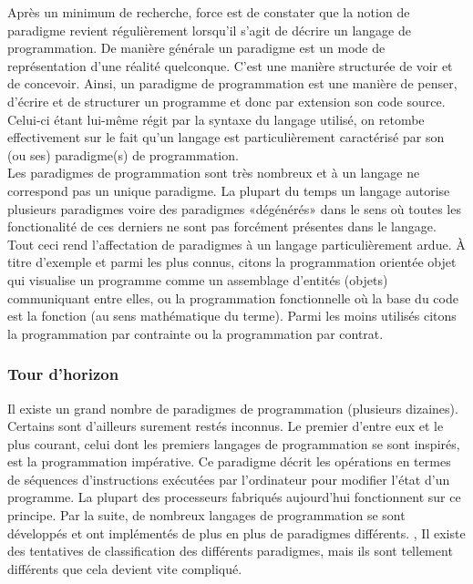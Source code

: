 Après un minimum de recherche, force est de constater que la notion de paradigme revient régulièrement lorsqu’il s’agit de décrire un langage de programmation.
De manière générale un paradigme est un mode de représentation d’une réalité quelconque. C’est une manière structurée de voir et de concevoir. Ainsi, un paradigme de programmation est une manière de penser, d’écrire et de structurer un programme et donc par extension son code source. Celui-ci étant lui-même régit par la syntaxe du langage utilisé, on retombe effectivement sur le fait qu’un langage est particulièrement caractérisé par son (ou ses) paradigme(s) de programmation.\\

Les paradigmes de programmation sont très nombreux et à un langage ne correspond pas un unique paradigme. La plupart du temps un langage autorise plusieurs paradigmes voire des paradigmes «dégénérés» dans le sens où toutes les fonctionalité de ces derniers ne sont pas forcément présentes dans le langage. Tout ceci rend l’affectation de paradigmes à un langage particulièrement ardue.
À titre d’exemple et parmi les plus connus, citons la programmation orientée objet qui visualise un programme comme un assemblage d’entités (objets) communiquant entre elles, ou la programmation fonctionnelle où la base du code est la fonction (au sens mathématique du terme). Parmi les moins utilisés citons la programmation par contrainte ou la programmation par contrat.

\subsubsection{Tour d'horizon}

Il existe un grand nombre de paradigmes de programmation (plusieurs dizaines). Certains sont d'ailleurs surement restés inconnus. Le premier d'entre eux et le plus courant, celui dont les premiers langages de programmation se sont inspirés, est la programmation impérative. Ce paradigme décrit les opérations en termes de séquences d'instructions exécutées par l'ordinateur pour modifier l'état d'un programme. La plupart des processeurs fabriqués aujourd'hui fonctionnent sur ce principe. Par la suite, de nombreux langages de programmation se sont développés et ont implémentés de plus en plus de paradigmes différents. \cite{bib_levenez}, \cite{bib_mandriva} Il existe des tentatives de classification des différents paradigmes, mais ils sont tellement différents que cela devient vite compliqué. \cite{bib_ucl}\\


